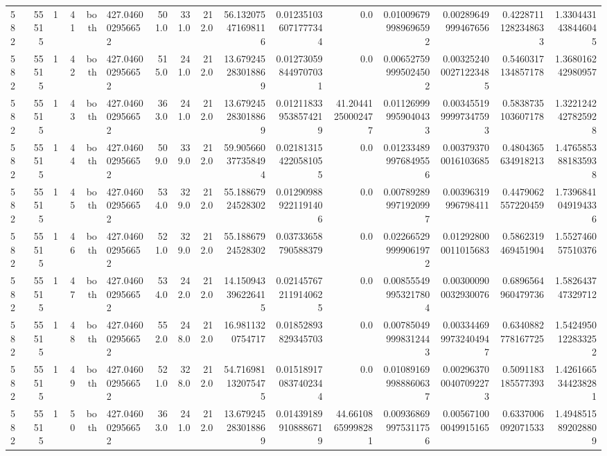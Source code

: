\begin{tabular}{lrrrrlrrrrrrrrrr}
582 & 55515 & 1 & 41 & both & 427.046002956652 & 501.0 & 331.0 & 212.0 & 56.132075471698116 & 0.012351036071777344 & 0.0 & 0.010096799989696592 & 0.00289649999467656 & 0.42287111282348633 & 1.3304431438446045 \\
582 & 55515 & 1 & 42 & both & 427.046002956652 & 515.0 & 241.0 & 212.0 & 13.679245283018869 & 0.012730598449707031 & 0.0 & 0.006527599995024502 & 0.0032524000271223485 & 0.5460317134857178 & 1.368016242980957 \\
582 & 55515 & 1 & 43 & both & 427.046002956652 & 363.0 & 241.0 & 212.0 & 13.679245283018869 & 0.012118339538574219 & 41.20441250002477 & 0.011269999959040433 & 0.0034551999997347593 & 0.5838735103607178 & 1.3221242427825928 \\
582 & 55515 & 1 & 44 & both & 427.046002956652 & 509.0 & 339.0 & 212.0 & 59.905660377358494 & 0.021813154220581055 & 0.0 & 0.012334899976849556 & 0.003793700016103685 & 0.4804365634918213 & 1.4765853881835938 \\
582 & 55515 & 1 & 45 & both & 427.046002956652 & 534.0 & 329.0 & 212.0 & 55.18867924528302 & 0.012909889221191406 & 0.0 & 0.007892899971920997 & 0.00396319996798411 & 0.4479062557220459 & 1.7396841049194336 \\
582 & 55515 & 1 & 46 & both & 427.046002956652 & 521.0 & 329.0 & 212.0 & 55.18867924528302 & 0.03733658790588379 & 0.0 & 0.022665299999061972 & 0.012928000011015683 & 0.5862319469451904 & 1.552746057510376 \\
582 & 55515 & 1 & 47 & both & 427.046002956652 & 534.0 & 242.0 & 212.0 & 14.150943396226415 & 0.021457672119140625 & 0.0 & 0.008555499953217804 & 0.003000900032930076 & 0.6896564960479736 & 1.582643747329712 \\
582 & 55515 & 1 & 48 & both & 427.046002956652 & 552.0 & 248.0 & 212.0 & 16.9811320754717 & 0.01852893829345703 & 0.0 & 0.007850499998312443 & 0.0033446999732404947 & 0.6340882778167725 & 1.5424950122833252 \\
582 & 55515 & 1 & 49 & both & 427.046002956652 & 521.0 & 328.0 & 212.0 & 54.716981132075475 & 0.015189170837402344 & 0.0 & 0.010891699988860637 & 0.0029637000407092273 & 0.5091183185577393 & 1.4261665344238281 \\
582 & 55515 & 1 & 50 & both & 427.046002956652 & 363.0 & 241.0 & 212.0 & 13.679245283018869 & 0.014391899108886719 & 44.66108659998281 & 0.009368699975311756 & 0.005671000049915165 & 0.6337006092071533 & 1.4948515892028809 \\
\hline
\end{tabular}
